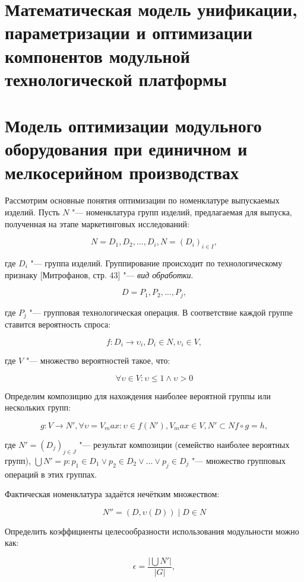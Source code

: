 \section{Математическая модель унификации, параметризации и оптимизации компонентов модульной технологической платформы}

\section{Модель оптимизации модульного оборудования при единичном и мелкосерийном производствах}

Рассмотрим основные понятия оптимизации по номенклатуре выпускаемых изделий. Пусть $N$ "--- номенклатура групп изделий, предлагаемая для выпуска, полученная на этапе маркетинговых исследований:

\[
N = {D_1, D_2, \ldots, D_i}, N = (D_i)_{i \in I},
\]

\noindent где $D_i$ "--- группа изделий. Группирование происходит по технологическому признаку [Митрофанов, стр. 43] "--- \textit{вид обработки}.

\[
D = {P_1, P_2, \ldots, P_j},
\]

\noindent где $P_j$ "--- групповая технологическая операция. В соответствие каждой группе ставится вероятность спроса:

\[
f: D_i \rightarrow \upsilon_i, D_i \in N, \upsilon_i \in V,
\]

\noindent где $V$ "--- множество вероятностей такое, что:

\[
\forall\upsilon\in V: \upsilon\leq 1 \wedge\upsilon > 0
\]

Определим композицию для нахождения наиболее вероятной группы или нескольких групп:

\[
g: V \rightarrow N', \forall\upsilon = V_max: \upsilon \in f(N'), V_max \in V, N' \subset N
f \circ g = h,
\]

\noindent где $N' = (D_j)_{j \in J}$ "--- результат композиции (семейство наиболее вероятных групп), $\bigcup N' = {p:p_1\in D_1 \vee p_2\in D_2 \vee\ldots\vee p_j\in D_j}$ "--- множество групповых операций в этих группах.

Фактическая номенклатура задаётся нечётким множеством:

\[
N'' = {(D, \upsilon(D)) \mid D \in N}
\]

Определить коэффициенты целесообразности использования модульности можно как:

\[
\epsilon = \frac{\big|\bigcup N' \big|}{|G|},
\]

